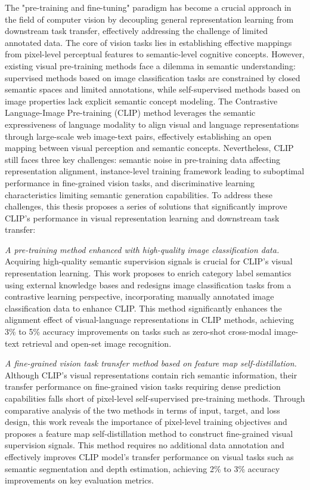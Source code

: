 \begin{abstract*}
The "pre-training and fine-tuning" paradigm has become a crucial approach in the field of computer vision by decoupling general representation learning from downstream task transfer, effectively addressing the challenge of limited annotated data. The core of vision tasks lies in establishing effective mappings from pixel-level perceptual features to semantic-level cognitive concepts. However, existing visual pre-training methods face a dilemma in semantic understanding: supervised methods based on image classification tasks are constrained by closed semantic spaces and limited annotations, while self-supervised methods based on image properties lack explicit semantic concept modeling. The Contrastive Language-Image Pre-training (CLIP) method leverages the semantic expressiveness of language modality to align visual and language representations through large-scale web image-text pairs, effectively establishing an open mapping between visual perception and semantic concepts.
Nevertheless, CLIP still faces three key challenges: semantic noise in pre-training data affecting representation alignment, instance-level training framework leading to suboptimal performance in fine-grained vision tasks, and discriminative learning characteristics limiting semantic generation capabilities. To address these challenges, this thesis proposes a series of solutions that significantly improve CLIP's performance in visual representation learning and downstream task transfer:

\textit{A pre-training method enhanced with high-quality image classification data.} Acquiring high-quality semantic supervision signals is crucial for CLIP's visual representation learning. This work proposes to enrich category label semantics using external knowledge bases and redesigns image classification tasks from a contrastive learning perspective, incorporating manually annotated image classification data to enhance CLIP. This method significantly enhances the alignment effect of visual-language representations in CLIP methods, achieving 3\% to 5\% accuracy improvements on tasks such as zero-shot cross-modal image-text retrieval and open-set image recognition.

\textit{A fine-grained vision task transfer method based on feature map self-distillation.} Although CLIP's visual representations contain rich semantic information, their transfer performance on fine-grained vision tasks requiring dense prediction capabilities falls short of pixel-level self-supervised pre-training methods. Through comparative analysis of the two methods in terms of input, target, and loss design, this work reveals the importance of pixel-level training objectives and proposes a feature map self-distillation method to construct fine-grained visual supervision signals. This method requires no additional data annotation and effectively improves CLIP model's transfer performance on visual tasks such as semantic segmentation and depth estimation, achieving 2\% to 3\% accuracy improvements on key evaluation metrics.


\end{abstract*}
